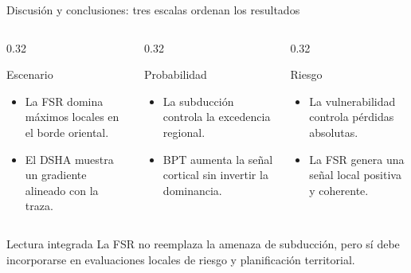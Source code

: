 \documentclass[aspectratio=169,10pt]{beamer}
\newcommand{\tightlist}{\setlength{\itemsep}{0.28em}}
\begin{document}
\begin{frame}[t]{Discusión y conclusiones: tres escalas ordenan los resultados}
\begin{columns}[T,onlytextwidth]
  \begin{column}{0.32\textwidth}
    \begin{block}{Escenario}
      \begin{itemize}\tightlist
        \item La FSR domina máximos locales en el borde oriental.
        \item El DSHA muestra un gradiente alineado con la traza.
      \end{itemize}
    \end{block}
  \end{column}
  \begin{column}{0.32\textwidth}
    \begin{block}{Probabilidad}
      \begin{itemize}\tightlist
        \item La subducción controla la excedencia regional.
        \item BPT aumenta la señal cortical sin invertir la dominancia.
      \end{itemize}
    \end{block}
  \end{column}
  \begin{column}{0.32\textwidth}
    \begin{block}{Riesgo}
      \begin{itemize}\tightlist
        \item La vulnerabilidad controla pérdidas absolutas.
        \item La FSR genera una señal local positiva y coherente.
      \end{itemize}
    \end{block}
  \end{column}
\end{columns}
\vspace{0.45em}
\begin{block}{Lectura integrada}
La FSR no reemplaza la amenaza de subducción, pero sí debe incorporarse en evaluaciones locales de riesgo y planificación territorial.
\end{block}
\end{frame}
\end{document}

